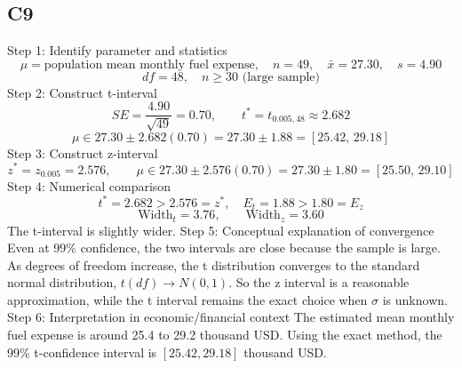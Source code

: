 \begin{ExamProblems}
		\subsection*{C9}
		Step 1: Identify parameter and statistics
		\[
		\mu=\text{population mean monthly fuel expense},\quad n=49,\quad \bar{x}=27.30,\quad s=4.90
		\]
		\[
		df=48,\quad n\ge 30\text{ (large sample)}
		\]
		Step 2: Construct t-interval
		\[
		SE=\frac{4.90}{\sqrt{49}}=0.70,\qquad t^*=t_{0.005,48}\approx 2.682
		\]
		\[
		\mu\in 27.30\pm 2.682(0.70)=27.30\pm 1.88=[25.42,\,29.18]
		\]
		Step 3: Construct z-interval
		\[
		z^*=z_{0.005}=2.576,\qquad \mu\in 27.30\pm 2.576(0.70)=27.30\pm 1.80=[25.50,\,29.10]
		\]
		Step 4: Numerical comparison
		\[
		t^*=2.682>2.576=z^*,\quad E_t=1.88>1.80=E_z
		\]
		\[
		\text{Width}_t=3.76,\qquad \text{Width}_z=3.60
		\]
		The t-interval is slightly wider.
		Step 5: Conceptual explanation of convergence
		Even at 99\% confidence, the two intervals are close because the sample is large.
		As degrees of freedom increase, the t distribution converges to the standard normal distribution, $t(df)\to N(0,1)$.
		So the z interval is a reasonable approximation, while the t interval remains the exact choice when $\sigma$ is unknown.
		Step 6: Interpretation in economic/financial context
		The estimated mean monthly fuel expense is around 25.4 to 29.2 thousand USD.
		Using the exact method, the 99\% t-confidence interval is $[25.42,29.18]$ thousand USD.
	\end{ExamProblems}

